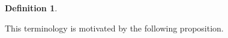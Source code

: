 \documentclass[12pt]{amsart}
\numberwithin{equation}{section}
\theoremstyle{definition}
\newtheorem{defn}[equation]{Definition}
\newcommand{\F}{\mathcal{F}}
\newcommand{\Y}{\mathcal{Y}}
\newcommand{\tx}[1]{\text{#1}}
\DeclareMathOperator{\HJL}{HJL}
\begin{document}
\begin{defn}

    
\end{defn}

This terminology is motivated by the following proposition.
\end{document}
